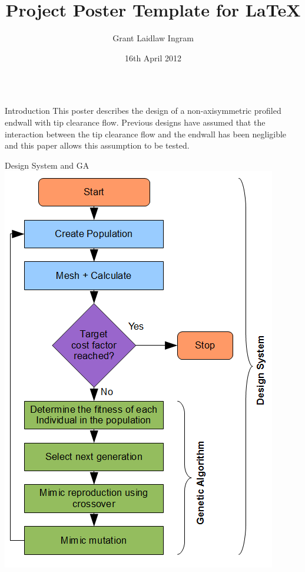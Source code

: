 \documentclass[final]{beamer}
\title[Final Year Project Poster]{Project Poster Template for \LaTeX}
\author[G Ingram]{Grant Laidlaw Ingram}
\institute[Durham]{School of Engineering and Computing Sciences, Durham University}
\date{16th April 2012}
\begin{document}
  \begin{frame}{} 

  \vfill
    \begin{columns}[t]
      \begin{column}{.48\linewidth}
        \begin{block}{Introduction}
          This poster describes the design of a non-axisymmetric
          profiled endwall with tip clearance flow. Previous designs
          have assumed that the interaction between the tip clearance
          flow and the endwall has been negligible and this paper
          allows this assumption to be tested.
        \end{block}

       

        \begin{block}{Design System and GA}
          \includegraphics[width=\columnwidth]{DesignSystemandGA}  
        \end{block}
      \end{column}



\end{columns}
\end{frame}
\end{document}
